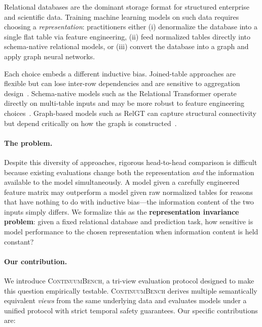 \documentclass[11pt]{article}
\newcommand{\cb}{\textsc{ContinuumBench}}
\begin{document}
Relational databases are the dominant storage format for structured
enterprise and scientific data.
Training machine learning models on such data requires choosing a
\emph{representation}: practitioners either (i) denormalize the database
into a single flat table via feature engineering, (ii) feed normalized
tables directly into schema-native relational models, or (iii) convert
the database into a graph and apply graph neural networks.

Each choice embeds a different inductive bias.
Joined-table approaches are flexible but can lose inter-row dependencies
and are sensitive to aggregation design~\citep{relbench}.
Schema-native models such as the Relational Transformer operate directly
on multi-table inputs and may be more robust to feature engineering
choices~\citep{rt}.
Graph-based models such as RelGT can capture structural connectivity but
depend critically on how the graph is constructed~\citep{relgt}.

\paragraph{The problem.}
Despite this diversity of approaches, rigorous head-to-head comparison
is difficult because existing evaluations change both the representation
\emph{and} the information available to the model simultaneously.
A model given a carefully engineered feature matrix may outperform a
model given raw normalized tables for reasons that have nothing to do
with inductive bias---the information content of the two inputs simply
differs.
We formalize this as the \textbf{representation invariance problem}:
given a fixed relational database and prediction task, how sensitive is
model performance to the chosen representation when information content
is held constant?

\paragraph{Our contribution.}
We introduce \cb{}, a tri-view evaluation protocol designed to
make this question empirically testable.
\cb{} derives multiple semantically equivalent \emph{views} from the
same underlying data and evaluates models under a unified protocol with
strict temporal safety guarantees.
Our specific contributions are:
\end{document}
